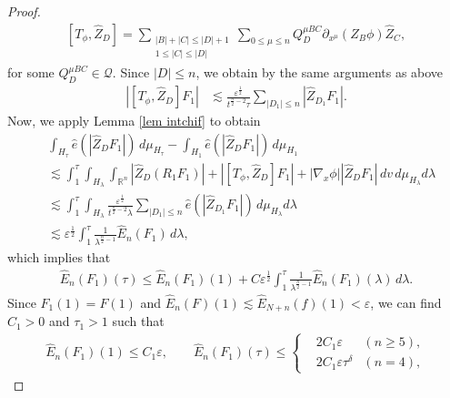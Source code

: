 \documentclass[10pt,a4paper]{amsart}
\newcommand{\bbr}{{\mathbb R}}
\newcommand{\bbrn}{{\bbr^n}}
\newcommand{\cQ}{{\mathcal Q}}
\begin{document}
\begin{proof}
\begin{align*}
\left[ T_\phi , \hat{ Z }_D \right] = \sum_{ \substack{ | B | + | C | \leq | D | + 1 \\ 1 \leq | C | \leq | D | } } \sum_{ 0 \leq \mu \leq n } Q^{ \mu B C }_{ D } \partial_{ x^\mu } ( Z_B \phi ) \hat{ Z }_C ,
\end{align*}
for some $ Q^{ \mu B C }_{ D } \in \cQ $. Since $ | D | \leq n $, we obtain by the same arguments as above
\begin{align*}
\left| \left[ T_\phi , \hat{ Z }_D \right] F_1 \right| & \lesssim \frac{ \varepsilon^{ \frac{ 1 }{ 2 } } }{ t^{ \frac{ n }{ 2 } - 2 } \tau } \sum_{ | D_1 | \leq n } | \hat{ Z }_{ D_1 } F_1 | .
\end{align*}
Now, we apply Lemma \ref{lem intchif} to obtain
\begin{align*}
& \int_{ H_\tau } \hat{ e } ( | \hat{ Z }_D F_1 | ) \, d \mu_{ H_\tau } - \int_{ H_1 } \hat{ e } ( | \hat{ Z }_D F_1 | ) \, d \mu_{ H_1 } \\
& \lesssim \int_1^\tau \int_{ H_\lambda } \int_\bbrn | \hat{ Z }_D ( R_1 F_1 ) | + \left| \left[ T_\phi , \hat{ Z }_D \right] F_1 \right| + | \nabla_x \phi | | \hat{ Z }_D F_1 | \, d v \, d \mu_{ H_\lambda } d \lambda \\
& \lesssim \int_1^\tau \int_{ H_\lambda } \frac{ \varepsilon^{ \frac{ 1 }{ 2 } } }{ t^{ \frac{ n }{ 2 } - 2 } \lambda } \sum_{ | D_1 | \leq n } \hat{ e } ( | \hat{ Z }_{ D_1 } F_1 | ) \, d \mu_{ H_\lambda } d \lambda \\
& \lesssim \varepsilon^{ \frac{ 1 }{ 2 } } \int_1^\tau \frac{ 1 }{ \lambda^{ \frac{ n }{ 2 } - 1 } } \hat{ E }_n ( F_1 ) \, d \lambda ,
\end{align*}
which implies that
\begin{align}
\hat{ E }_n ( F_1 ) ( \tau ) \leq \hat{ E }_n ( F_1 ) ( 1 ) + C \varepsilon^{ \frac{ 1 }{ 2 } } \int_1^\tau \frac{ 1 }{ \lambda^{ \frac{ n }{ 2 } - 1 } } \hat{ E }_n ( F_1 ) ( \lambda ) \, d \lambda . \label{FGronwall}
\end{align}
Since $ F_1 ( 1 ) = F ( 1 ) $ and $ \hat{ E }_n ( F ) ( 1 ) \lesssim \hat{ E }_{ N + n } ( f ) ( 1 ) < \varepsilon $, we can find $ C_{ 1 } > 0 $ and $ \tau_{ 1 } > 1 $ such that
\begin{align}
\hat{ E }_n ( F_1 ) ( 1 ) \leq C_{ 1 } \varepsilon , \qquad \hat{ E }_n ( F_1 ) ( \tau ) \leq
\left\{
\begin{aligned}
& 2 C_{ 1 } \varepsilon & ( n \geq 5 ) , \\
& 2 C_{ 1 } \varepsilon \tau^\delta & ( n = 4 ) ,

\end{aligned}
\end{align}
\end{proof}
\end{document}
